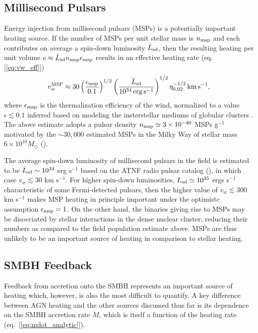 \documentclass[usenatbib,fleqn]{mn2e}
\begin{document}
\subsection{Millisecond Pulsars}
 Energy injection from millisecond pulsars (MSPs) is a potentially
important heating source.  If the number of MSPs per unit stellar mass
is $n_{\rm msp}$ and each contributes on average a spin-down
luminosity $\bar{L}_{\rm sd}$, then the resulting heating per unit
volume $e \approx \bar{L}_{\rm sd}n_{\rm msp}\epsilon_{\rm msp}$ results in an
effective heating rate (eq.~ [\ref{eq:vw_eff}])
\begin{eqnarray} v_{w}^{\rm MSP} \approx
30\left(\frac{\epsilon_{\rm msp}}{0.1}\right)^{1/2}\left(\frac{\bar{L}_{\rm
sd}}{10^{34}\,{\rm erg\,s^{-1}}}\right)^{1/2} \eta_{0.02}^{-1/2}\,{\rm
km\,s^{-1}},
 \label{eq:vmsp}
  \end{eqnarray} 
where $\epsilon_{\rm msp}$ is the thermalization efficiency of
the wind, normalized to a value $\epsilon \lesssim 0.1$ inferred based
on modeling the insterstellar mediums of globular clusters
\citep{NaimanSoares-Furtado+:2013a}.  The above estimate adopts a
pulsar density $n_{\rm msp}\simeq3 \times 10^{-40} $ MSPs g$^{-1}$
motivated by the $\sim 30,000$ estimated MSPs in the Milky Way of
stellar mass $6\times 10^{10}M_{\odot}$ (\citealt{Lorimer13}).

The average spin-down luminosity of millisecond pulsars in the field
is estimated to be $\bar{L}_{\rm sd} \sim 10^{34}$ erg s$^{-1}$ based
on the ATNF radio pulsar catalog (\citealt{Manchester+05}), in which
case $v_{w} \lesssim 30$ km s$^{-1}$.  For higher spin-down
luminosities, $L_{\rm sd}\simeq 10^{35}$ ergs s$^{-1}$ characteristic
of some Fermi-detected pulsars, then the higher value of $v_{w}
\lesssim 300$ km s$^{-1}$ makes MSP heating in principle important
under the optimistc assumption $\epsilon_{\rm msp} = 1$.  On the other hand, the
binaries giving rise to MSPs may be disocciated by stellar
interactions in the dense nuclear cluster, reducing their numbers as
compared to the field population estimate above.  MSPs are thus unlikely to be an important source of heating in comparison to stellar heating.


\subsection{SMBH Feedback}

Feedback from accretion onto the SMBH represents an important source of heating which, however, is also the most difficult to quantify.  A key difference between AGN heating and the other sources discussed thus far is its dependence on the SMBH accretion rate $\dot{M}$, which is itself a function of the heating rate (eq.~[\ref{eq:mdot_analytic}]).  
\end{document}
